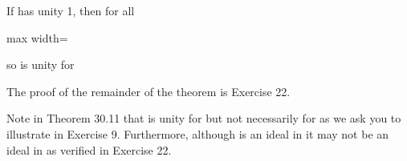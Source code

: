 \documentclass[11pt,oneside]{article}
\begin{document}
\begin{BookBody}
If  has unity 1, then for all 

\begin{center}\begin{adjustbox}{max width=\linewidth}\end{adjustbox}\end{center}

\noindent so  is unity for 

The proof of the remainder of the theorem is Exercise 22. \BookEnd{\blacklozenge}

Note in Theorem 30.11 that  is unity for \BookInline{\phi [R],\allowbreak } but not necessarily for  as we ask you to illustrate in Exercise 9. Furthermore, although \BookInline{\phi [N]} is an ideal in \BookInline{\phi [R],\allowbreak } it may not be an ideal in  as verified in Exercise 22.

\end{BookBody}

\BookNarrativetrue
\end{document}
